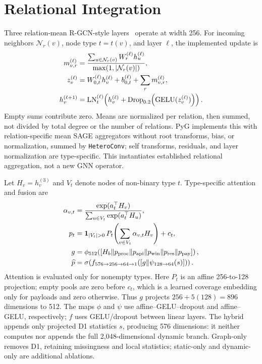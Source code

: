 \documentclass[journal]{IEEEtran}
\begin{document}
\section{Relational Integration}
Three relation-mean R-GCN-style layers~\cite{rgcn} operate at width 256.
For incoming neighbors $\mathcal N_r(v)$, node type $t=t(v)$, and layer
$\ell$, the implemented update is
\begin{align}
m_{v,r}^{(\ell)}
&=\frac{\sum_{u\in\mathcal N_r(v)}W_r^{(\ell)}h_u^{(\ell)}}
{\max(1,|\mathcal N_r(v)|)},\label{eq:mean}\\
z_v^{(\ell)}
&=W_{0,t}^{(\ell)}h_v^{(\ell)}+b_{0,t}^{(\ell)}
+\sum_r m_{v,r}^{(\ell)},\notag\\
h_v^{(\ell+1)}
&=\operatorname{LN}_{t}^{(\ell)}\!\left(h_v^{(\ell)}+
\operatorname{Drop}_{0.2}\!\left(\operatorname{GELU}(z_v^{(\ell)})\right)\right).
\label{eq:residual}
\end{align}
Empty sums contribute zero. Means are normalized per relation, then summed,
not divided by total degree or the number of relations. PyG implements
this with relation-specific mean SAGE aggregators without root transforms,
bias, or normalization, summed by \texttt{HeteroConv}; self transforms,
residuals, and layer normalization are type-specific. This instantiates
established relational aggregation, not a new GNN operator.

Let $H_v=h_v^{(3)}$ and $V_t$ denote nodes of non-binary type $t$.
Type-specific attention and fusion are
\begin{align}
\alpha_{v,t}&=\frac{\exp(a_t^\top H_v)}
{\sum_{u\in V_t}\exp(a_t^\top H_u)},\notag\\
p_t&=\mathbf{1}_{|V_t|>0}\,P_t\!\left(\sum_{v\in V_t}
\alpha_{v,t}H_v\right)+c_t,\label{eq:pool}\\
g&=\phi_{512}\!\left([H_b\Vert p_{\rm proc}\Vert p_{\rm api}
\Vert p_{\rm win}\Vert p_{\rm res}\Vert p_{\rm pay}]\right),\notag\\
\widehat p&=\sigma\!\left(f_{576\to256\to64\to1}
([g\Vert\psi_{128\to64}(s)])\right).\label{eq:fusion}
\end{align}
Attention is evaluated only for nonempty types. Here $P_t$ is an affine
256-to-128 projection; empty pools are zero before
$c_t$, which is a learned coverage embedding only for payloads and zero
otherwise. Thus $g$ projects $256+5(128)=896$ dimensions to 512.
The maps $\phi$ and $\psi$ use affine--GELU--dropout and affine--GELU,
respectively; $f$ uses GELU/dropout between linear layers.
The hybrid appends only projected D1 statistics $s$, producing 576
dimensions: it neither computes nor appends the full 2,048-dimensional
dynamic branch. Graph-only removes D1, retaining missingness and local
statistics; static-only and dynamic-only are additional ablations.
\end{document}
